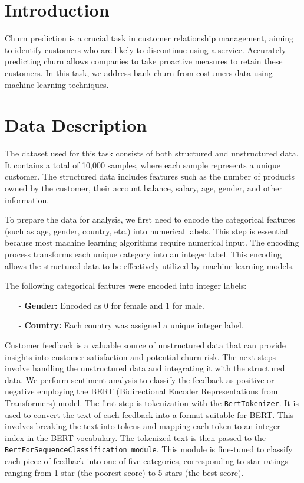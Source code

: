\documentclass[12pt]{article}
\begin{document}
\section{Introduction}
Churn prediction is a crucial task in customer relationship management, aiming to identify customers who are likely to discontinue using a service. Accurately predicting churn allows companies to take proactive measures to retain these customers. In this task, we address bank churn from costumers data using machine-learning techniques. 

\section{Data Description}
The dataset used for this task consists of both structured and unstructured data. It contains a total of 10,000 samples, where each sample represents a unique customer. The structured data includes features such as the number of products owned by the customer, their account balance, salary, age, gender, and other information. 

To prepare the data for analysis, we first need to encode the categorical features (such as age, gender, country, etc.) into numerical labels. This step is essential because most machine learning algorithms require numerical input. The encoding process transforms each unique category into an integer label. This encoding allows the structured data to be effectively utilized by machine learning models.

The following categorical features were encoded into integer labels:
\begin{itemize}
    \item[-] \textbf{Gender:} Encoded as 0 for female and 1 for male.
    \item[-] \textbf{Country:} Each country was assigned a unique integer label.
\end{itemize}
 
Customer feedback is a valuable source of unstructured data that can provide insights into customer satisfaction and potential churn risk. The next steps involve handling the unstructured data and integrating it with the structured data. We perform sentiment analysis to classify the feedback as positive or negative employing the BERT (Bidirectional Encoder Representations from Transformers) model. The first step is tokenization with the \texttt{BertTokenizer}. It is used to convert the text of each feedback into a format suitable for BERT. This involves breaking the text into tokens and mapping each token to an integer index in the BERT vocabulary. The tokenized text is then passed to the \texttt{BertForSequenceClassification module}. This module is fine-tuned to classify each piece of feedback into one of five categories, corresponding to star ratings ranging from 1 star (the poorest score) to 5 stars (the best score).
\end{document}
